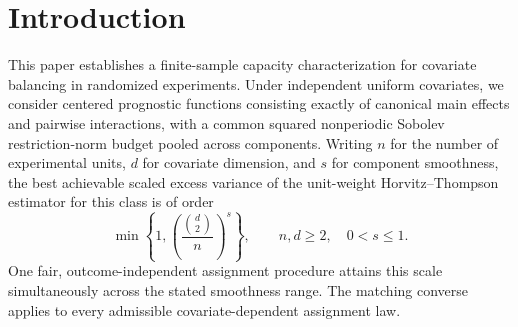 \begin{abstract}
We characterize the finite-sample minimax excess variance of Horvitz--Thompson estimation under covariate-dependent experimental assignment. Covariates are independent uniform draws on the unit cube, and the conditional potential-outcome midpoint mean is centered, has an exact main-and-pair-effect decomposition, and satisfies a pooled nonperiodic Sobolev restriction-norm budget. For every sample size \(n\geq2\), covariate dimension \(d\geq2\), and smoothness \(0<s\leq1\), the minimax scaled excess variance is comparable to \(\min\{1,(B/n)^s\}\), where \(B=\binom d2\) is the number of coordinate pairs, with positive comparison constants uniform over this parameter range. A single fair, outcome-independent assignment law, independent of smoothness, attains this scale on all original units. An independent coefficient-sign prior supplies the matching lower bound against every admissible design. The characterization is logarithm-free, includes the endpoint \(s=1\), and yields vanishing minimax scaled excess exactly when \(d=o(\sqrt n)\) for each fixed smoothness. The causal interpretation applies to arbitrary square-integrable potential outcomes with the specified uniform-covariate prognostic class.
\end{abstract}

\section{Introduction}

This paper establishes a finite-sample capacity characterization for covariate balancing in randomized experiments. Under independent uniform covariates, we consider centered prognostic functions consisting exactly of canonical main effects and pairwise interactions, with a common squared nonperiodic Sobolev restriction-norm budget pooled across components. Writing \(n\) for the number of experimental units, \(d\) for covariate dimension, and \(s\) for component smoothness, the best achievable scaled excess variance of the unit-weight Horvitz--Thompson estimator for this class is of order
\[
\min\left\{1,\left(\frac{\binom d2}{n}\right)^s\right\},
\qquad n,d\geq2,\quad 0<s\leq1.
\]
One fair, outcome-independent assignment procedure attains this scale simultaneously across the stated smoothness range. The matching converse applies to every admissible covariate-dependent assignment law.

